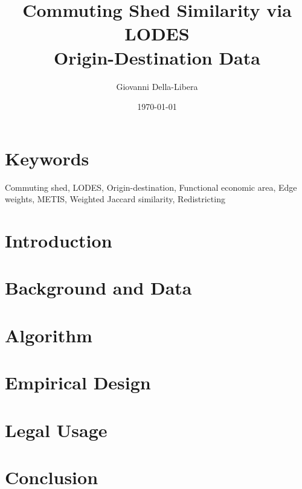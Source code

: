 \documentclass[12pt]{article}
\title{\textbf{Commuting Shed Similarity via LODES\\
Origin-Destination Data}}
\author{Giovanni Della-Libera}
\date{\today}
\begin{document}
\maketitle

\begin{abstract}

\end{abstract}

\section*{Keywords}
Commuting shed, LODES, Origin-destination, Functional economic area,
Edge weights, METIS, Weighted Jaccard similarity, Redistricting

\section{Introduction}


\section{Background and Data}


\section{Algorithm}


\section{Empirical Design}


\section{Legal Usage}


\section{Conclusion}




\end{document}
